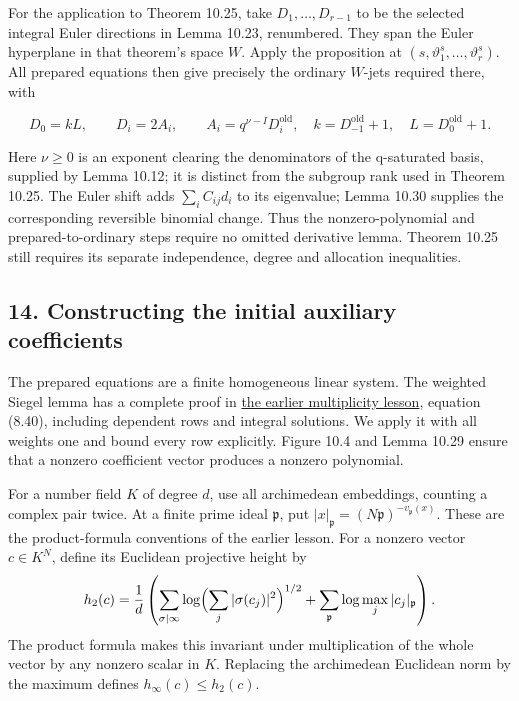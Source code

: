 \documentclass[
  11pt,
  a4paper,
]{article}
\begin{document}
For the application to Theorem 10.25, take \(D_1,\ldots,D_{r-1}\) to be
the selected integral Euler directions in Lemma 10.23, renumbered. They
span the Euler hyperplane in that theorem's space \(W\). Apply the
proposition at \((s,\vartheta_1^s,\ldots,\vartheta_r^s)\). All prepared
equations then give precisely the ordinary \(W\)-jets required there,
with

\[
D_0=kL,\qquad D_i=2A_i,
\qquad A_i=q^{\nu-I}D_i^{\mathrm{old}},\quad
k=D_{-1}^{\mathrm{old}}+1,\quad L=D_0^{\mathrm{old}}+1.
\tag{10.94}
\]

Here \(\nu\ge0\) is an exponent clearing the denominators of the
q-saturated basis, supplied by Lemma 10.12; it is distinct from the
subgroup rank used in Theorem 10.25. The Euler shift adds
\(\sum_i C_{ij}d_i\) to its eigenvalue; Lemma 10.30 supplies the
corresponding reversible binomial change. Thus the nonzero-polynomial
and prepared-to-ordinary steps require no omitted derivative lemma.
Theorem 10.25 still requires its separate independence, degree and
allocation inequalities.

\subsection{14. Constructing the initial auxiliary
coefficients}\label{constructing-the-initial-auxiliary-coefficients}

The prepared equations are a finite homogeneous linear system. The
weighted Siegel lemma has a complete proof in
\href{../TR-BAKER-08.html\#small-solutions-over-the-coefficient-field}{the
earlier multiplicity lesson}, equation (8.40), including dependent rows
and integral solutions. We apply it with all weights one and bound every
row explicitly. Figure 10.4 and Lemma 10.29 ensure that a nonzero
coefficient vector produces a nonzero polynomial.

For a number field \(K\) of degree \(d\), use all archimedean
embeddings, counting a complex pair twice. At a finite prime ideal
\(\mathfrak p\), put
\(|x|_{\mathfrak p}=(N\mathfrak p)^{-v_{\mathfrak p}(x)}\). These are
the product-formula conventions of the earlier lesson. For a nonzero
vector \(c\in K^N\), define its Euclidean projective height by \[
h_2(c)=\frac1d\left(
\sum_{\sigma\mid\infty}\log\Bigl(\sum_j|\sigma(c_j)|^2\Bigr)^{1/2}
+\sum_{\mathfrak p}\log\max_j|c_j|_{\mathfrak p}\right).
\] The product formula makes this invariant under multiplication of the
whole vector by any nonzero scalar in \(K\). Replacing the archimedean
Euclidean norm by the maximum defines \(h_\infty(c)\le h_2(c)\).
\end{document}
